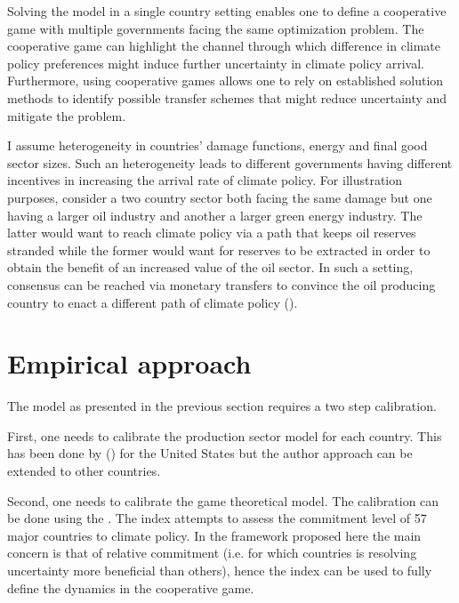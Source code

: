 \documentclass[american]{scrartcl}
\newcommand{\citein}[1]{\citeauthor{#1} (\citeyear{#1})}
\begin{document}
Solving the model in a single country setting enables one to define a cooperative game with multiple governments facing the same optimization problem. The cooperative game can highlight the channel through which difference in climate policy preferences might induce further uncertainty in climate policy arrival. Furthermore, using cooperative games allows one to rely on established solution methods to identify possible transfer schemes that might reduce uncertainty and mitigate the problem.

I assume heterogeneity in countries' damage functions, energy and final good sector sizes. Such an heterogeneity leads to different governments having different incentives in increasing the arrival rate of climate policy. For illustration purposes, consider a two country sector both facing the same damage but one having a larger oil industry and another a larger green energy industry. The latter would want to reach climate policy via a path that keeps oil reserves stranded while the former would want for reserves to be extracted in order to obtain the benefit of an increased value of the oil sector. In such a setting, consensus can be reached via monetary transfers to convince the oil producing country to enact a different path of climate policy (\cite{Ju2006}).

\section{Empirical approach}

The model as presented in the previous section requires a two step calibration.

First, one needs to calibrate the production sector model for each country. This has been done by \citein{Barnett2019} for the United States but the author approach can be extended to other countries.

Second, one needs to calibrate the game theoretical model. The calibration can be done using the \citeauthor{Burck2020}. The index attempts to assess the commitment level of 57 major countries to climate policy. In the framework proposed here the main concern is that of relative commitment (i.e. for which countries is resolving uncertainty more beneficial than others), hence the index can be used to fully define the dynamics in the cooperative game.


\newpage
\nocite{*}
\printbibliography
\end{document}
